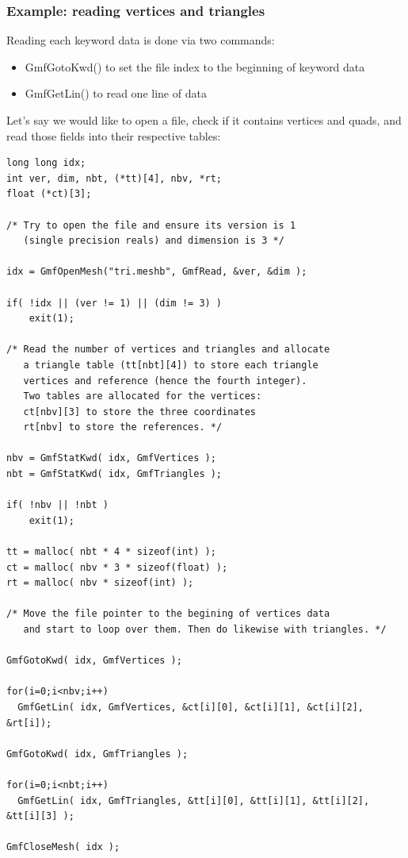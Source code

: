 \documentclass[a4paper,12pt]{article}
\begin{document}
\subsubsection{Example: reading vertices and triangles}

Reading each keyword data is done via two commands:

\begin{itemize}
\item GmfGotoKwd() to set the file index to the beginning of keyword data
\item GmfGetLin() to read one line of data
\end{itemize}

Let's say we would like to open a file, check if it contains vertices and quads, and read those fields into their respective tables:

\begin{tt}
\begin{verbatim}
long long idx;
int ver, dim, nbt, (*tt)[4], nbv, *rt;
float (*ct)[3];

/* Try to open the file and ensure its version is 1
   (single precision reals) and dimension is 3 */

idx = GmfOpenMesh("tri.meshb", GmfRead, &ver, &dim );

if( !idx || (ver != 1) || (dim != 3) )
    exit(1);

/* Read the number of vertices and triangles and allocate
   a triangle table (tt[nbt][4]) to store each triangle
   vertices and reference (hence the fourth integer).
   Two tables are allocated for the vertices:
   ct[nbv][3] to store the three coordinates
   rt[nbv] to store the references. */

nbv = GmfStatKwd( idx, GmfVertices );
nbt = GmfStatKwd( idx, GmfTriangles );

if( !nbv || !nbt )
    exit(1);

tt = malloc( nbt * 4 * sizeof(int) );
ct = malloc( nbv * 3 * sizeof(float) );
rt = malloc( nbv * sizeof(int) );

/* Move the file pointer to the begining of vertices data
   and start to loop over them. Then do likewise with triangles. */

GmfGotoKwd( idx, GmfVertices );

for(i=0;i<nbv;i++)
  GmfGetLin( idx, GmfVertices, &ct[i][0], &ct[i][1], &ct[i][2], &rt[i]);

GmfGotoKwd( idx, GmfTriangles );

for(i=0;i<nbt;i++)
  GmfGetLin( idx, GmfTriangles, &tt[i][0], &tt[i][1], &tt[i][2], &tt[i][3] );

GmfCloseMesh( idx );
\end{verbatim}
\end{tt}
\normalfont
\end{document}
